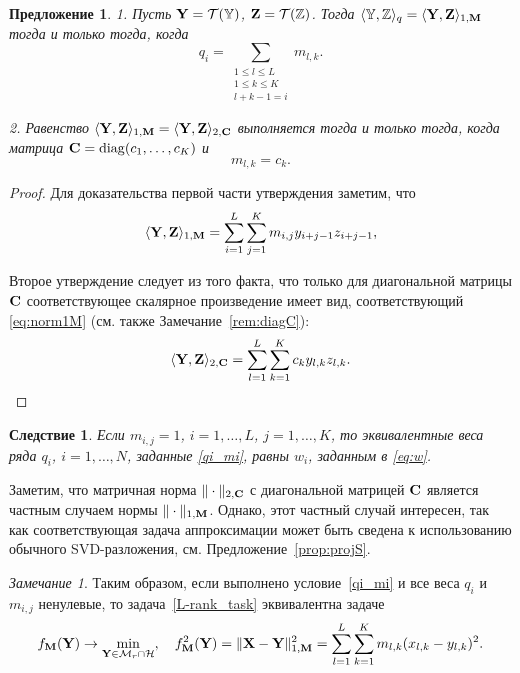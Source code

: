 \documentclass[12pt, specialist, subf,href,colorlinks=true,substylefile = spbu.rtx]{disser}
\newtheorem{corollary}{Следствие}
\newtheorem{proposition}{Предложение}
\theoremstyle{remark}
\newtheorem{remark}{Замечание}
\theoremstyle{definition}
\begin{document}
\begin{proposition}
\label{prop:equiv_tasks}
1. Пусть $\mathbf{Y} = \mathcal{T}(\mathbb{Y})$,  $\mathbf{Z} = \mathcal{T}(\mathbb{Z})$. Тогда $\langle\mathbb{Y},\mathbb{Z}\rangle_q= \langle \mathbf{Y},\mathbf{Z} \rangle_{1,\mathbf{M}}$ тогда и только тогда, когда
\begin{equation}\label{qi_mi}
q_i = \sum_{\substack{1 \le l \le L \\ 1 \le k \le K \\ l+k-1=i}} m_{l,k}.
\end{equation}

2. Равенство $\langle\mathbf{Y},\mathbf{Z}\rangle_{1,\mathbf{M}}= \langle\mathbf{Y},\mathbf{Z}\rangle_{2,\mathbf{C}}$ выполняется тогда и только тогда, когда матрица $\mathbf{C}=\mathop{\mathrm{diag}}(c_1,\ldots,c_K)$ и
\begin{equation}\label{sk_mlk}
m_{l,k}=c_k.
\end{equation}
\end{proposition}
\begin{proof}
Для доказательства первой части утверждения заметим, что
\begin{equation*}
\langle \mathbf{Y}, \mathbf{Z} \rangle_{1,\mathbf{M}} = \sum_{i = 1}^L \sum_{j = 1}^K m_{i,j} y_{i + j - 1} z_{i + j - 1},
\end{equation*}

Второе утверждение следует из того факта, что только для диагональной матрицы $\mathbf{C}$ соответствующее скалярное произведение имеет вид, соответствующий \eqref{eq:norm1M} (см. также Замечание~\ref{rem:diagC}):
\begin{equation*}
\langle \mathbf{Y}, \mathbf{Z} \rangle_{2,\mathbf{C}} = \sum_{l=1}^L \sum_{k=1}^K c_k y_{l,k} z_{l, k}.
\end{equation*}
\end{proof}

\begin{corollary}
\label{cor:base_weights}
	Если $m_{i,j}=1$, $i =1, \ldots, L$, $j = 1, \ldots, K$, то эквивалентные веса ряда $q_i$, $i = 1, \ldots, N$, заданные \eqref{qi_mi}, равны $w_i$, заданным в \eqref{eq:w}.
\end{corollary}

Заметим, что матричная норма  $\|\cdot\|_{2, \mathbf{C}}$ с диагональной матрицей $\mathbf{C}$ является частным случаем нормы $\|\cdot\|_{1, \mathbf{M}}$. Однако, этот частный случай интересен, так как соответствующая задача аппроксимации может быть сведена к использованию обычного SVD-разложения, см. Предложение~\ref{prop:projS}.

\begin{remark}
\label{rem:2tasks}
Таким образом, если выполнено условие~\eqref{qi_mi} и все веса $q_i$ и $m_{i,j}$ ненулевые, то задача~\eqref{L-rank_task}
эквивалентна задаче
\begin{equation}
	\label{rank_task}
	f_{\mathbf{M}}(\mathbf{Y}) \to \min_{\mathbf{Y} \in \mathcal{M}_r \cap \mathcal{H}}, \quad f^2_{\mathbf{M}}(\mathbf{Y}) = \|\mathbf{X}-\mathbf{Y}\|^2_{1,\mathbf{M}} = \sum_{l = 1}^L \sum_{k=1}^K m_{l,k} (x_{l,k} - y_{l,k})^2.
\end{equation}
\end{remark}
\end{document}

